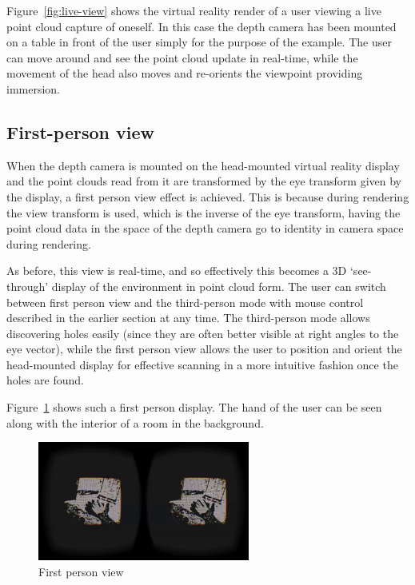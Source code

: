 \documentclass[pageno]{jpaper}
\begin{document}
Figure~\ref{fig:live-view} shows the virtual reality render of a user viewing a
live point cloud capture of oneself. In this case the depth camera has been
mounted on a table in front of the user simply for the purpose of the
example. The user can move around and see the point cloud update in real-time,
while the movement of the head also moves and re-orients the viewpoint providing
immersion.

\subsection{First-person view}

When the depth camera is mounted on the head-mounted virtual reality display and
the point clouds read from it are transformed by the eye transform given by the
display, a first person view effect is achieved. This is because during
rendering the view transform is used, which is the inverse of the eye transform,
having the point cloud data in the space of the depth camera go to identity in
camera space during rendering.

As before, this view is real-time, and so effectively this becomes a 3D
`see-through' display of the environment in point cloud form. The user can
switch between first person view and the third-person mode with mouse control
described in the earlier section at any time. The third-person mode allows
discovering holes easily (since they are often better visible at right angles to
the eye vector), while the first person view allows the user to position and
orient the head-mounted display for effective scanning in a more intuitive
fashion once the holes are found.

Figure~\ref{fig:first-person-view} shows such a first person display. The hand
of the user can be seen along with the interior of a room in the background.

\begin{figure}
  \centering
    \includegraphics[width=0.62\textwidth]{shot1.png}
  \caption{First person view}
  \label{fig:first-person-view}
\end{figure}
\end{document}
